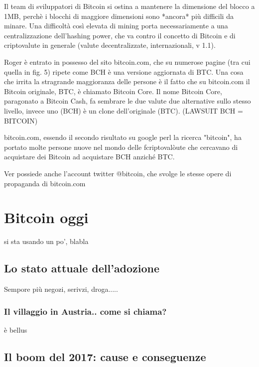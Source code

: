 \documentclass {article}
\begin{document}
Il team di sviluppatori di Bitcoin si ostina a mantenere la dimensione del blocco a 1MB, perchè i blocchi di maggiore dimensioni sono *ancora* più difficili da minare. Una difficoltà così elevata di mining porta necessariamente a una centralizzazione dell'hashing power, che va contro il concetto di Bitcoin e di criptovalute in generale (valute decentralizzate, internazionali, v 1.1).

Roger è entrato in possesso del sito bitcoin.com, che su numerose pagine (tra cui quella in fig. 5) ripete come BCH è una versione aggiornata di BTC. Una cosa che irrita la stragrande maggioranza delle persone è il fatto che su bitcoin.com il Bitcoin originale, BTC, è chiamato Bitcoin Core. Il nome Bitcoin Core, paragonato a Bitcoin Cash, fa sembrare le due valute due alternative sullo stesso livello, invece uno (BCH) è un clone dell'originale (BTC). (LAWSUIT BCH = BITCOIN)

bitcoin.com, essendo il secondo risultato su google perl la ricerca "bitcoin", ha portato molte persone nuove nel mondo delle fcriptovalòute che cercavano di acquistare dei Bitcoin ad acquistare BCH anziché BTC.

Ver possiede anche l'account twitter @bitcoin, che svolge le stesse opere di propaganda di bitcoin.com



\section {Bitcoin oggi}



si sta usando un po', blabla



\subsection {Lo stato attuale dell'adozione}



Sempore più negozi, serivzi, droga.....



\subsubsection {Il villaggio in Austria.. come si chiama?}



è bellus



\subsection {Il boom del 2017: cause e conseguenze}
\end{document}
